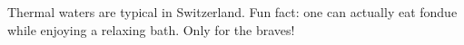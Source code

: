 Thermal waters are typical in Switzerland.
Fun fact: one can actually eat fondue while enjoying a relaxing bath.
Only for the braves!